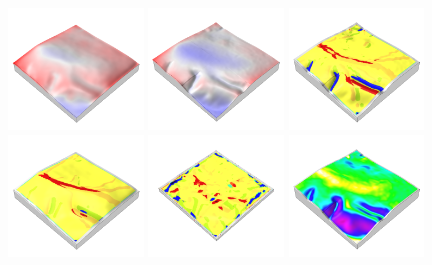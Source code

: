 \documentclass[prodmode,acmtochi]{acmsmall} %
\begin{document}
\begin{figure}[h!]
\begin{center}
		\includegraphics[width=0.32\textwidth]{images/render_3d/mean_dem_difference_4.png}
		\includegraphics[width=0.32\textwidth]{images/render_3d/mean_dem_regression_difference_4.png} %
		\includegraphics[width=0.32\textwidth]{images/render_3d/forms_4.png}
		\includegraphics[width=0.32\textwidth]{images/render_3d/mean_forms_4.png}
		\includegraphics[width=0.32\textwidth]{images/render_3d/stdev_forms_4.png}
		\includegraphics[width=0.32\textwidth]{images/render_3d/slope_4.png}

\end{center}
\end{figure}
\end{document}
